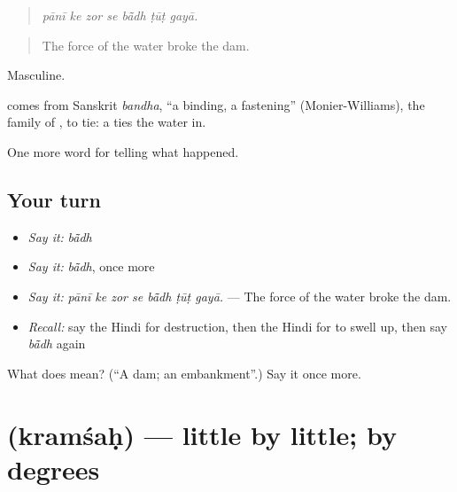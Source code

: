 \begin{quote}
      
\end{quote}

\begin{quote}
\emph{pānī ke zor se bā̃dh ṭūṭ gayā.}
\end{quote}

\begin{quote}
The force of the water broke the dam.
\end{quote}

Masculine.

\begin{cousinweb}
comes from Sanskrit \emph{bandha}, \textquotedblleft{}a binding, a fastening\textquotedblright{} (Monier-Williams), the family of \textbf{}, to tie: a \textbf{} ties the water in.
\end{cousinweb}

\begin{grammarlens}[title={What you've built}]
One more word for telling what happened.
\end{grammarlens}

\subsection*{Your turn}
\begin{itemize}
\raggedright
  \item \emph{Say it:} \emph{bā̃dh}
  \item \emph{Say it:} \emph{bā̃dh}, once more
  \item \emph{Say it:} \emph{pānī ke zor se bā̃dh ṭūṭ gayā.} — The force of the water broke the dam.
  \item \emph{Recall:} say the Hindi for destruction, then the Hindi for to swell up, then say \emph{bā̃dh} again
\end{itemize}

\begin{tcolorbox}[breakable,colback=teal!4,colframe=teal!35!black,title={Before you move on}]
What does  mean? (\textquotedblleft{}A dam; an embankment\textquotedblright{}.) Say it once more.
\end{tcolorbox}
\section[\texorpdfstring{\hi{क्रमशः} (kramśaḥ)}{क्रमशः (kramśaḥ)}]{ (kramśaḥ) — little by little; by degrees}

